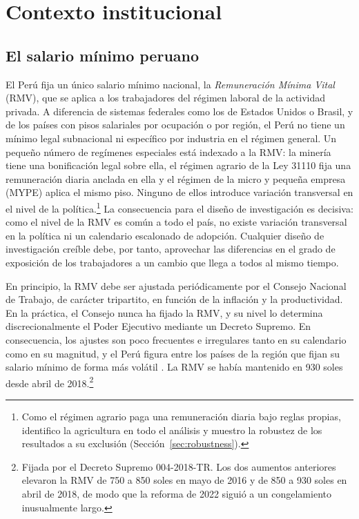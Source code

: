 \section{Contexto institucional}\label{sec:institutional}

\subsection{El salario mínimo peruano}

El Perú fija un único salario mínimo nacional, la \emph{Remuneración Mínima Vital} (RMV), que se aplica a los trabajadores del régimen laboral de la actividad privada. A diferencia de sistemas federales como los de Estados Unidos o Brasil, y de los países con pisos salariales por ocupación o por región, el Perú no tiene un mínimo legal subnacional ni específico por industria en el régimen general. Un pequeño número de regímenes especiales está indexado a la RMV: la minería tiene una bonificación legal sobre ella, el régimen agrario de la Ley 31110 fija una remuneración diaria anclada en ella y el régimen de la micro y pequeña empresa (MYPE) aplica el mismo piso. Ninguno de ellos introduce variación transversal en el nivel de la política.\footnote{Como el régimen agrario paga una remuneración diaria bajo reglas propias, identifico la agricultura en todo el análisis y muestro la robustez de los resultados a su exclusión (Sección~\ref{sec:robustness}).} La consecuencia para el diseño de investigación es decisiva: como el nivel de la RMV es común a todo el país, no existe variación transversal en la política ni un calendario escalonado de adopción. Cualquier diseño de investigación creíble debe, por tanto, aprovechar las diferencias en el grado de exposición de los trabajadores a un cambio que llega a todos al mismo tiempo.

En principio, la RMV debe ser ajustada periódicamente por el Consejo Nacional de Trabajo, de carácter tripartito, en función de la inflación y la productividad. En la práctica, el Consejo nunca ha fijado la RMV, y su nivel lo determina discrecionalmente el Poder Ejecutivo mediante un Decreto Supremo. En consecuencia, los ajustes son poco frecuentes e irregulares tanto en su calendario como en su magnitud, y el Perú figura entre los países de la región que fijan su salario mínimo de forma más volátil \citep{jimenez_2023, cespedes_2005}. La RMV se había mantenido en 930 soles desde abril de 2018.\footnote{Fijada por el Decreto Supremo 004-2018-TR. Los dos aumentos anteriores elevaron la RMV de 750 a 850 soles en mayo de 2016 y de 850 a 930 soles en abril de 2018, de modo que la reforma de 2022 siguió a un congelamiento inusualmente largo.}

